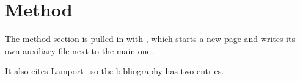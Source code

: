 \section{Method}\label{sec:method}

The method section is pulled in with \verb||, which starts a new
page and writes its own auxiliary file next to the main one.

It also cites Lamport~\cite{lamport1994} so the bibliography has two entries.
